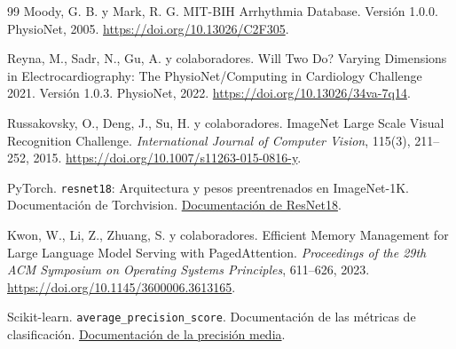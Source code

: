 \begin{thebibliography}{99}
Moody, G. B. y Mark, R. G.
\newblock MIT-BIH Arrhythmia Database. Versión 1.0.0.
\newblock PhysioNet, 2005.
\newblock \url{https://doi.org/10.13026/C2F305}.

Reyna, M., Sadr, N., Gu, A. y colaboradores.
\newblock Will Two Do? Varying Dimensions in Electrocardiography: The PhysioNet/Computing in Cardiology Challenge 2021. Versión 1.0.3.
\newblock PhysioNet, 2022.
\newblock \url{https://doi.org/10.13026/34va-7q14}.

Russakovsky, O., Deng, J., Su, H. y colaboradores.
\newblock ImageNet Large Scale Visual Recognition Challenge.
\newblock \emph{International Journal of Computer Vision}, 115(3), 211--252, 2015.
\newblock \url{https://doi.org/10.1007/s11263-015-0816-y}.

PyTorch.
\newblock \texttt{resnet18}: Arquitectura y pesos preentrenados en ImageNet-1K.
\newblock Documentación de Torchvision.
\newblock \href{https://docs.pytorch.org/vision/stable/models/generated/torchvision.models.resnet18.html}{Documentación de ResNet18}.

Kwon, W., Li, Z., Zhuang, S. y colaboradores.
\newblock Efficient Memory Management for Large Language Model Serving with PagedAttention.
\newblock \emph{Proceedings of the 29th ACM Symposium on Operating Systems Principles}, 611--626, 2023.
\newblock \url{https://doi.org/10.1145/3600006.3613165}.

Scikit-learn.
\newblock \texttt{average\_precision\_score}.
\newblock Documentación de las métricas de clasificación.
\newblock \href{https://scikit-learn.org/stable/modules/generated/sklearn.metrics.average_precision_score.html}{Documentación de la precisión media}.

\end{thebibliography}
